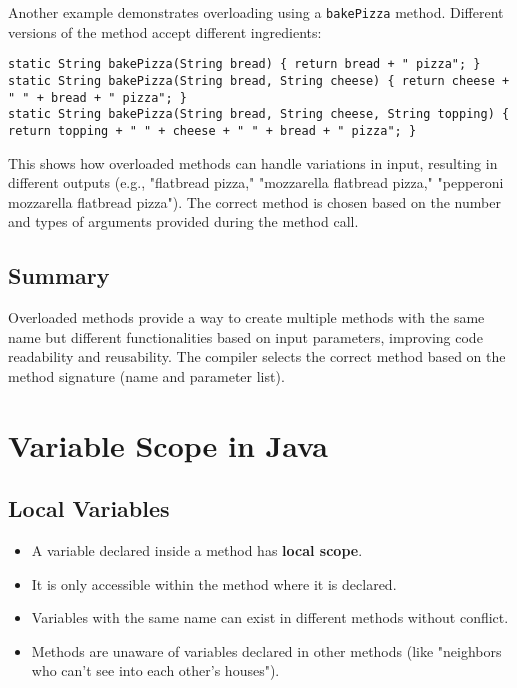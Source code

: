 \documentclass{article}
\begin{document}
Another example demonstrates overloading using a \texttt{bakePizza} method.  Different versions of the method accept different ingredients:

\begin{verbatim}
static String bakePizza(String bread) { return bread + " pizza"; }
static String bakePizza(String bread, String cheese) { return cheese + " " + bread + " pizza"; }
static String bakePizza(String bread, String cheese, String topping) { return topping + " " + cheese + " " + bread + " pizza"; }
\end{verbatim}

This shows how overloaded methods can handle variations in input, resulting in different outputs (e.g., "flatbread pizza," "mozzarella flatbread pizza," "pepperoni mozzarella flatbread pizza").  The correct method is chosen based on the number and types of arguments provided during the method call.


\subsection{Summary}

Overloaded methods provide a way to create multiple methods with the same name but different functionalities based on input parameters, improving code readability and reusability.  The compiler selects the correct method based on the method signature (name and parameter list).


\section{Variable Scope in Java}

\subsection{Local Variables}
\begin{itemize}
    \item A variable declared inside a method has \textbf{local scope}.
    \item It is only accessible within the method where it is declared.
    \item Variables with the same name can exist in different methods without conflict.
    \item  Methods are unaware of variables declared in other methods (like "neighbors who can't see into each other's houses").
\end{itemize}
\end{document}
